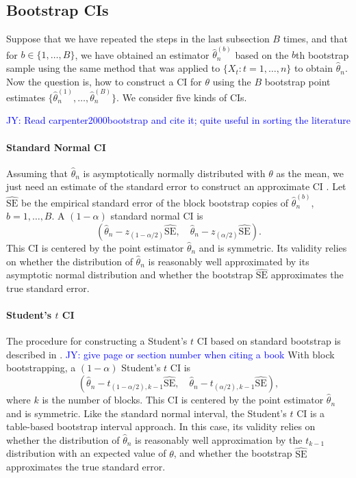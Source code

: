 \documentclass[12pt, letterpaper, titlepage]{article}
\newcommand{\jy}[1]{\textcolor{blue}{JY: #1}}
\begin{document}
\subsection{Bootstrap CIs}

Suppose that we have repeated the steps in the last subsection $B$ times, and
that for $b \in \{1, \ldots, B\}$, we have obtained an estimator
$\hat\theta_n^{(b)}$ based on the $b$th bootstrap sample using the same method
that was applied to $\{X_t: t = 1, \ldots, n\}$ to obtain $\hat\theta_n$.
Now the question is, how to construct a CI for $\theta$
using the $B$ bootstrap point estimates
$\{\hat\theta_n^{(1)}, \ldots, \hat\theta_n^{(B)}\}$.
We consider five kinds of CIs.

\jy{Read carpenter2000bootstrap and cite it; quite useful in sorting the literature}

\paragraph{Standard Normal CI}
Assuming that $\hat\theta_n$ is asymptotically normally distributed with
$\theta$ as the mean, we just need an estimate of the standard error to
construct an approximate CI \citep[p.168]{efron1993introduction}.
Let $\widehat{\text{SE}}$ be the empirical standard error of the block bootstrap
copies of $\hat\theta_n^{(b)}$, $b = 1, \ldots, B$.
A $(1 - \alpha)$ standard normal CI is
\[
(\hat{\theta}_{n} - z_{(1-\alpha/2)}\widehat{\text{SE}}, \quad
\hat{\theta}_{n} - z_{(\alpha/2)}\widehat{\text{SE}}).
\]
This CI is centered by the point estimator $\hat\theta_n$ and is symmetric.
Its validity relies on whether the distribution of $\hat\theta_n$ is reasonably
well approximated by its asymptotic normal distribution and whether the
bootstrap $\widehat{\text{SE}}$ approximates the true standard error.



\paragraph{Student's $t$ CI}
The procedure for constructing a Student's $t$ CI based on standard bootstrap is
described in \citet{efron1993introduction}. \jy{give page or section number when
  citing a book}
With block bootstrapping, a $(1 - \alpha)$ Student's $t$ CI is
\[
(\hat{\theta}_{n} - t_{(1-\alpha/2), k - 1}\hat{\text{SE}}, \quad
\hat{\theta}_{n} - t_{(\alpha/2), k -1}\hat{\text{SE}}),
\]
where $k$ is the number of blocks.
This CI is centered by the point estimator $\hat\theta_n$ and is symmetric.
Like the standard 
normal interval, the Student's $t$ CI is a table-based bootstrap interval
approach. In this case,
its validity relies on whether the distribution of $\hat\theta_n$ is
reasonably well approximation by the $t_{k-1}$ distribution with an
expected value of $\theta$, and whether the bootstrap 
$\widehat{\text{SE}}$ approximates the true standard error.
\end{document}
